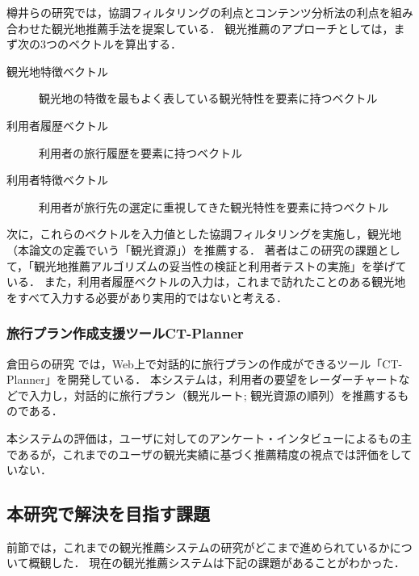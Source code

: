 \documentclass{jsarticle}
\begin{document}
樽井らの研究\cite{tarui}では，協調フィルタリングの利点とコンテンツ分析法の利点を組み合わせた観光地推薦手法を提案している．
観光推薦のアプローチとしては，まず次の3つのベクトルを算出する．

\begin{description}
\item[観光地特徴ベクトル] 観光地の特徴を最もよく表している観光特性を要素に持つベクトル
\item[利用者履歴ベクトル] 利用者の旅行履歴を要素に持つベクトル
\item[利用者特徴ベクトル] 利用者が旅行先の選定に重視してきた観光特性を要素に持つベクトル
\end{description}

次に，これらのベクトルを入力値とした協調フィルタリングを実施し，観光地（本論文の定義でいう「観光資源」）を推薦する．
著者はこの研究の課題として，「観光地推薦アルゴリズムの妥当性の検証と利用者テストの実施」を挙げている．
また，利用者履歴ベクトルの入力は，これまで訪れたことのある観光地をすべて入力する必要があり実用的ではないと考える．

\subsubsection{旅行プラン作成支援ツールCT-Planner}

倉田らの研究\cite{ctplanner}\cite{ctplanner2}\cite{ctplanner3}\cite{ctplanner3b}\cite{ctplanner4}\cite{ctplanner5} では，Web上で対話的に旅行プランの作成ができるツール「CT-Planner\cite{ctplanner_web}」を開発している．
本システムは，利用者の要望をレーダーチャートなどで入力し，対話的に旅行プラン（観光ルート; 観光資源の順列）を推薦するものである．

本システムの評価は，ユーザに対してのアンケート・インタビューによるもの主であるが，これまでのユーザの観光実績に基づく推薦精度の視点では評価をしていない．

\subsection{本研究で解決を目指す課題}
\label{problem}

前節では，これまでの観光推薦システムの研究がどこまで進められているかについて概観した．
現在の観光推薦システムは下記の課題があることがわかった．
\end{document}
